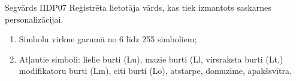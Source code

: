 {Segvārds}
{IIDP07}
{
	Reģistrēta lietotāja vārds, kas tiek izmantots saskarnes personalizācijai.
}
{
	\begin{enumerate}
		\item Simbolu virkne garumā no 6 līdz 255 simboliem;
		\item Atļautie simboli: lielie burti (Lu), mazie burti (Ll, virsraksta burti (Lt,) modifikatoru burti (Lm), citi burti (Lo), atstarpe, domuzīme, apakšsvītra.
	\end{enumerate}
}
{
}
